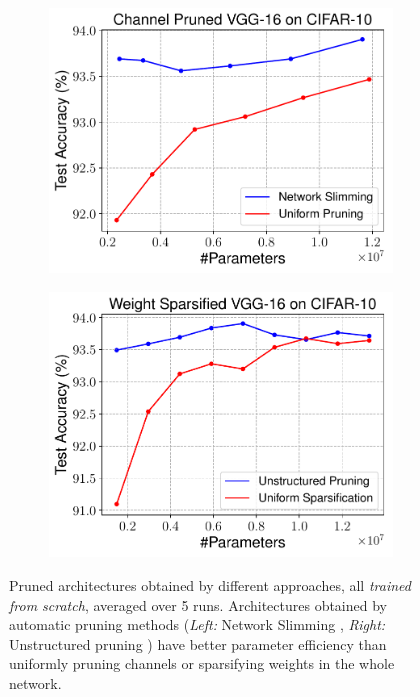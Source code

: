  
\begin{figure}[!ht]
\centering
\begin{minipage}{.47\textwidth}
 \begin{subfigure}{\textwidth}
 \centering
 \includegraphics[width=\textwidth]{figures/cifar10-vgg16-slimming.pdf}
 \label{arch-search-a1}
 \end{subfigure}
\end{minipage}
\begin{minipage}{.47\textwidth}
 \begin{subfigure}{\textwidth}
 \centering
 \includegraphics[width=\textwidth]{figures/cifar10-vgg16-weight-level-3.pdf}
 \label{arch-search-b1}
 \end{subfigure}
\end{minipage}
    \vspace{-3ex}
    \caption{
      Pruned architectures obtained by different approaches, all \emph{trained from scratch}, averaged over 5 runs.  
      Architectures obtained by  automatic pruning methods (\emph{Left:} Network Slimming \citep{liu2017learning}, \emph{Right:} Unstructured pruning \citep{han2015learning}) have better parameter efficiency than uniformly pruning channels or sparsifying weights in the whole network. }  
    \label{arch-search}
    \vspace{-1ex}
\end{figure}
